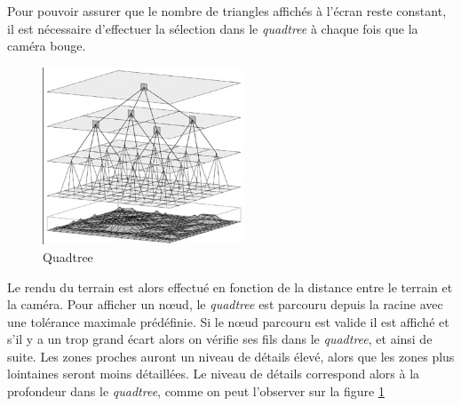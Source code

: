     Pour pouvoir assurer que le nombre de triangles affichés à l'écran reste constant, il est nécessaire d'effectuer la sélection dans le \emph{quadtree} à chaque fois que la caméra bouge.\\
    \vspace{0.5cm}
    \begin{figure}
 \includegraphics[width=6cm]{img/quadtree.png}
   \caption[Quadtree]{Quadtree\protect\footnotemark}
   \label{fig:quadtree-selection}
 \end{figure}
    Le rendu du terrain est alors effectué en fonction de la distance entre le terrain et la caméra. Pour afficher un n\oe{}ud, le \emph{quadtree} est parcouru depuis la racine avec une tolérance maximale prédéfinie. Si le n\oe{}ud parcouru est valide il est affiché et s'il y a un trop grand écart alors on vérifie ses fils dans le \emph{quadtree}, et ainsi de suite. Les zones proches auront un niveau de détails élevé, alors que les zones plus lointaines seront moins détaillées. Le niveau de détails correspond alors à la profondeur dans le \emph{quadtree}, comme on peut l'observer sur la figure \ref{fig:quadtree-selection}

\newpage

